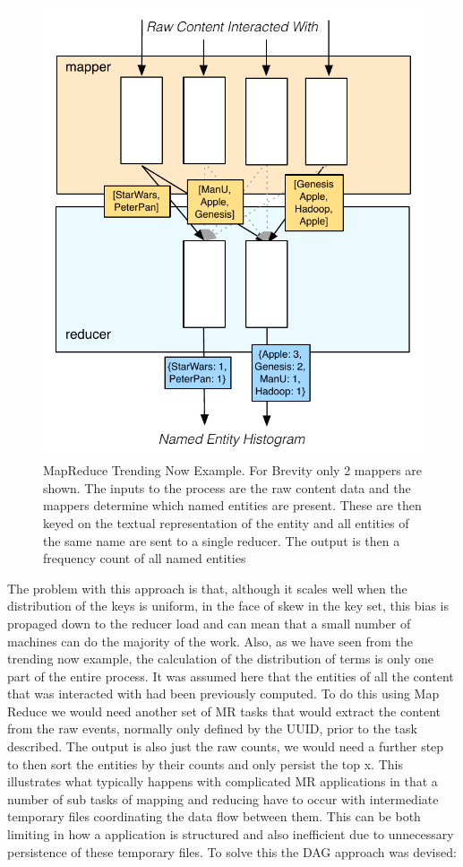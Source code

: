 \documentclass[a4paper,11pt]{scrreprt}
\begin{document}
\begin{figure}[h]
\centering
\includegraphics[scale=0.7] {MapReduceEx.pdf}
\caption{MapReduce Trending Now Example. For Brevity only 2 mappers are shown. The inputs to the process are the raw content data and the mappers determine which named entities are present. These are then keyed on the textual representation of the entity and all entities of the same name are sent to a single reducer. The output is then a frequency count of all named entities}
\label{fig:MapReduceEx}
\end{figure}

The problem with this approach is that, although it scales well when the distribution of the keys is uniform, in the face of skew in the key set, this bias is propaged down to the reducer load and can mean that a small number of machines can do the majority of the work. Also, as we have seen from the trending now example, the calculation of the distribution of terms is only one part of the entire process. It was assumed here that the entities of all the content that was interacted with had been previously computed. To do this using Map Reduce we would need another set of MR tasks that would extract the content from the raw events, normally only defined by the UUID, prior to the task described. The output is also just the raw counts, we would need a further step to then sort the entities by their counts and only persist the top x. This illustrates what typically happens with complicated MR applications in that a number of sub tasks of mapping and reducing have to occur with intermediate temporary files coordinating the data flow between them. This can be both limiting in how a application is structured and also inefficient due to unnecessary persistence of these temporary files. To solve this the DAG approach was devised:
\end{document}
